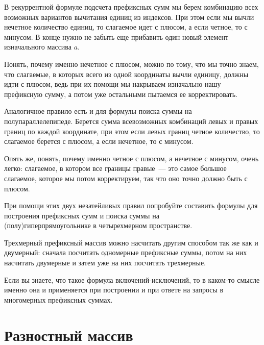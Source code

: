 \begin{theorem}
    В рекуррентной формуле подсчета префиксных сумм мы берем комбинацию всех возможных вариантов вычитания единиц из индексов. При этом если мы вычли нечетное количество единиц, то слагаемое идет с плюсом, а если четное, то с минусом. В конце нужно не забыть еще прибавить один новый элемент изначального массива $a$.

    Понять, почему именно нечетное с плюсом, можно по тому, что мы точно знаем, что слагаемые, в которых всего из одной координаты вычли единицу, должны идти с плюсом, ведь при их помощи мы накрываем изначально нашу префиксную сумму, а потом уже остальными пытаемся ее корректировать.
\end{theorem}

\begin{theorem}
    Аналогичное правило есть и для формулы поиска суммы на полупараллелепипеде. Берется сумма всевозможных комбинаций левых и правых границ по каждой координате, при этом если левых границ четное количество, то слагаемое берется с плюсом, а если нечетное, то с минусом.

    Опять же, понять, почему именно четное с плюсом, а нечетное с минусом, очень легко: слагаемое, в котором все границы правые~--- это самое большое слагаемое, которое мы потом корректируем, так что оно точно должно быть с плюсом.
\end{theorem}

\begin{exercise}
    При помощи этих двух незатейливых правил попробуйте составить формулы для построения префиксных сумм и поиска суммы на\\(полу)гиперпрямоугольнике в четырехмерном пространстве.
\end{exercise}

\begin{observation}
    Трехмерный префиксный массив можно насчитать другим способом так же как и двумерный: сначала посчитать одномерные префиксные суммы, потом на них насчитать двумерные и затем уже на них посчитать трехмерные.
\end{observation}

\begin{observation}
    Если вы знаете, что такое формула включений-исключений, то в каком-то смысле именно она и применяется при построении и при ответе на запросы в многомерных префиксных суммах.
\end{observation}


\section{Разностный массив}

